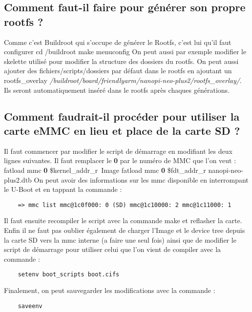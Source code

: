 \documentclass{ReportTemplate}
\begin{document}
\subsection{Comment faut-il faire pour générer son propre rootfs ?}
Comme c'est Buildroot qui s'occupe de générer le Rootfs, c'est lui qu'il faut
configurer \newline
cd /buildroot \newline
make menuconfig \newline
On peut aussi par exemple modifier le skelette utilisé pour modifier la
structure des dossiers du rootfs. On peut aussi ajouter des
fichiers/scripts/dossiers par défaut dans le rootfs en ajoutant un
rootfs\_overlay
\textit{/buildroot/board/friendlyarm/nanopi-neo-plus2/rootfs\_overlay/}. Ils
seront automatiquement inséré dans le rootfs après chaques générations.

\subsection{Comment faudrait-il procéder pour utiliser la carte eMMC en lieu et place de la carte SD ?}
Il faut commencer par modifier le script de démarrage en modifiant les deux
lignes suivantes. Il faut remplacer le \textbf{0} par le numéro de MMC que l'on
veut : \newline
 fatload mmc \textbf{0} \$kernel\_addr\_r\ Image \newline
 fatload mmc \textbf{0} \$fdt\_addr\_r nanopi-neo-plus2.dtb \newline
On peut avoir des informations sur les mmc disponible en interrompant le U-Boot
et en tappant la commande : \newline
\begin{verbatim}
    => mmc list mmc@1c0f000: 0 (SD) mmc@1c10000: 2 mmc@1c11000: 1 
\end{verbatim}

Il faut ensuite recompiler le script avec la commande make et reflasher la
carte. Enfin il ne faut pas oublier également de charger l'Image et le device
tree depuis la carte SD vers la mmc interne (a faire une seul fois) ainsi que de
modifier le script de démarrage pour utiliser celui que l'on vient de compiler
avec la commande : \newline
\begin{verbatim}
    setenv boot_scripts boot.cifs
\end{verbatim}
 
Finalement, on peut sauvegarder les modifications avec la commande :\newline
\begin{verbatim}
    saveenv
\end{verbatim}
\end{document}
